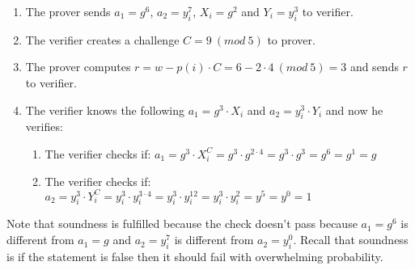 \begin{enumerate}
    \item The prover sends $a_1=g^6$, $a_2=y_i^7$, $X_i=g^2$ and $Y_i=y_i^3$ to verifier.
    \item The verifier creates a challenge \begin{math}C=9\ (mod \ 5) \end{math} to prover.
    \item The prover computes \begin{math}r=w-p(i)  \cdot  C = 6-2  \cdot  4 \ (mod \ 5)= 3\end{math} and sends $r$ to verifier.
    \item The verifier knows the following  $a_1=g^3  \cdot  X_i$ and $a_2=y_i^3  \cdot  Y_i$ and now he verifies:
    \begin{enumerate}        
        \item The verifier checks if: \begin{math}a_1 = g^3 \cdot X_i^C = g^3 \cdot g^{2 \cdot 4} = g^3  \cdot  g^3 = g^6= g^1= g\end{math}
        \item The verifier checks if: \begin{math} a_2=y_i^3  \cdot  Y_i^C = y_i^3  \cdot  y_i^{3 \cdot 4}= y_i^3  \cdot  y_i^{12}= y_i^3  \cdot  y_i^2= y^5=y^0= 1 \end{math}
    \end{enumerate}
\end{enumerate}

\noindent
Note that soundness is fulfilled because the check doesn't pass because $a_1=g^6$ is different from $a_1=g$ and $a_2=y_i^7$ is different from $ a_2=y_i^0$. Recall that soundness is if the statement is false then it should fail with overwhelming probability.\\

